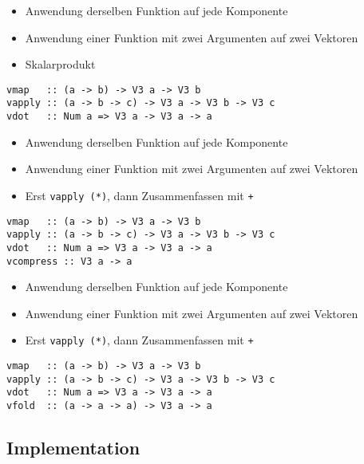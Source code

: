 \documentclass{beamer}
\begin{document}
\begin{frame}[fragile]
\begin{overprint}
\begin{itemize}
 \item Anwendung derselben Funktion auf jede Komponente
 \item Anwendung einer Funktion mit zwei Argumenten auf zwei Vektoren
 \item Skalarprodukt
\end{itemize}
\begin{verbatim}
vmap   :: (a -> b) -> V3 a -> V3 b
vapply :: (a -> b -> c) -> V3 a -> V3 b -> V3 c
vdot   :: Num a => V3 a -> V3 a -> a
\end{verbatim}
\begin{itemize}
 \item Anwendung derselben Funktion auf jede Komponente
 \item Anwendung einer Funktion mit zwei Argumenten auf zwei Vektoren
 \item Erst \texttt{vapply (*)}, dann Zusammenfassen mit \texttt{+}
\end{itemize}
\begin{verbatim}
vmap   :: (a -> b) -> V3 a -> V3 b
vapply :: (a -> b -> c) -> V3 a -> V3 b -> V3 c
vdot   :: Num a => V3 a -> V3 a -> a
vcompress :: V3 a -> a
\end{verbatim}
\begin{itemize}
 \item Anwendung derselben Funktion auf jede Komponente
 \item Anwendung einer Funktion mit zwei Argumenten auf zwei Vektoren
 \item Erst \texttt{vapply (*)}, dann Zusammenfassen mit \texttt{+}
\end{itemize}
\begin{verbatim}
vmap   :: (a -> b) -> V3 a -> V3 b
vapply :: (a -> b -> c) -> V3 a -> V3 b -> V3 c
vdot   :: Num a => V3 a -> V3 a -> a
vfold  :: (a -> a -> a) -> V3 a -> a
\end{verbatim}
\end{overprint}
\end{frame}

\subsection{Implementation}
\end{document}
